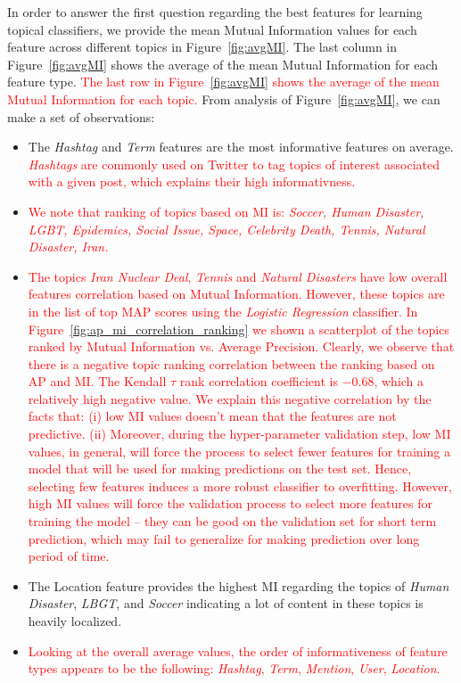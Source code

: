 In order to answer the first question regarding the best features
for learning topical classifiers, we provide the mean Mutual Information
values for each feature across different topics in Figure~\ref{fig:avgMI}.
The last column in Figure~\ref{fig:avgMI} shows the
average of the mean Mutual Information for each feature type. \textcolor{red}{ The last row in Figure~\ref{fig:avgMI} shows the
average of the mean Mutual Information for each topic.} From analysis of
Figure~\ref{fig:avgMI}, we can make a set of observations:
\begin{itemize}
\item The \textit{Hashtag} and \textit{Term} features are the most informative features on average. \textcolor{red}{ \textit{Hashtags} are commonly used on Twitter to tag topics of interest associated with a given post, which explains their high informativness.}


\item  \textcolor{red}{We note that ranking of topics based on MI is: \emph{Soccer, Human Disaster, LGBT, Epidemics, Social Issue, Space, Celebrity Death, Tennis, Natural Disaster, Iran.}}

\item \textcolor{red}{The topics \textit{Iran Nuclear Deal}, \textit{Tennis} and \textit{Natural Disasters} have low overall features correlation based on Mutual Information. However, these topics  are in the list of top MAP scores using the \textit{Logistic Regression} classifier. In Figure~\ref{fig:ap_mi_correlation_ranking} we shown a scatterplot of the topics ranked by Mutual Information vs. Average Precision. Clearly, we observe that there is a negative topic ranking correlation between the ranking based on AP and MI. The Kendall $\tau$  rank correlation coefficient is $-0.68$, which a relatively high negative value. We explain this negative correlation by the facts that: (i) low MI values doesn't mean that the features are not predictive. (ii) Moreover, during the hyper-parameter validation step, low MI values, in general, will force the process to select fewer features for training a model that will be used for making predictions on the test set. Hence, selecting few features  induces a more robust classifier to overfitting. However, high MI values will force the validation process to select more features for training the model -- they can be good on the validation set for short term prediction, which may fail to generalize for making prediction over long period of time.}

\item The Location feature provides the highest MI regarding the topics of \textit{Human Disaster}, \textit{LBGT}, and \textit{Soccer} indicating a lot of content in these topics is heavily localized. 


\item \textcolor{red}{ Looking at the overall average values, the order of informativeness of feature types appears to be the following: \textit{Hashtag}, \textit{Term}, \textit{Mention}, \textit{User}, \textit{Location}.}
\end{itemize}




